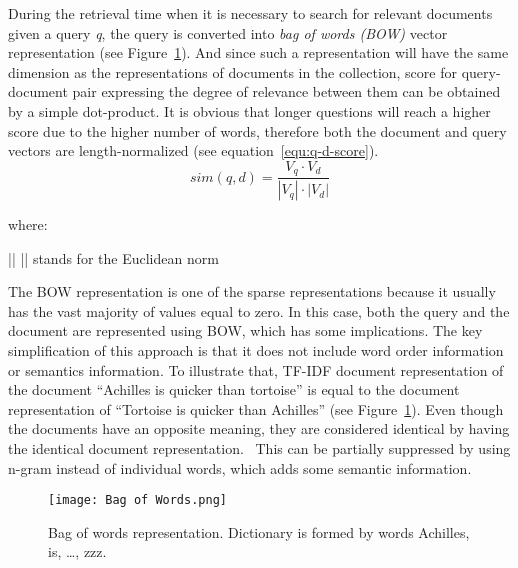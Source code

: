     During the retrieval time when it is necessary to search for relevant documents given a query \emph{q}, the query is converted into \emph{bag of words (BOW)} vector representation (see Figure~\ref{fig:bow}). And since such a representation will have the same dimension as the representations of documents in the collection, score for query-document pair expressing the degree of relevance between them can be obtained by a simple dot-product. It is obvious that longer questions will reach a higher score due to the higher number of words, therefore both the document and query vectors are length-normalized (see equation~\ref{equ:q-d-score}).
    \begin{equation}
        \label{equ:q-d-score}
        sim(q, d) = \frac{V_{q} \cdot V_{d}}{|V_{q}| \cdot |V_{d}|}
    \end{equation}
    
    where:
    \begin{where}
        \item [|| \cdot ||] stands for the Euclidean norm~\parencite{manning2008introduction}
    \end{where}

    The BOW representation is one of the sparse representations because it usually has the vast majority of values equal to zero. In this case, both the query and the document are represented using BOW, which has some implications. The key simplification of this approach is that it does not include word order information or semantics information. To illustrate that, TF-IDF document representation of the document \enquote{Achilles is quicker than tortoise} is equal to the document representation of \enquote{Tortoise is quicker than Achilles} (see Figure~\ref{fig:bow}). Even though the documents have an opposite meaning, they are considered identical by having the identical document representation.~\parencite{manning2008introduction} This can be partially suppressed by using n-gram instead of individual words, which adds some semantic information.
    \begin{figure}[H]
        \texttt{[image: Bag of Words.png]}
        \centering
        \caption[Bag of words representation]{Bag of words representation. Dictionary is formed by words Achilles, is, \dots, zzz.}
        \label{fig:bow}
    \end{figure}


